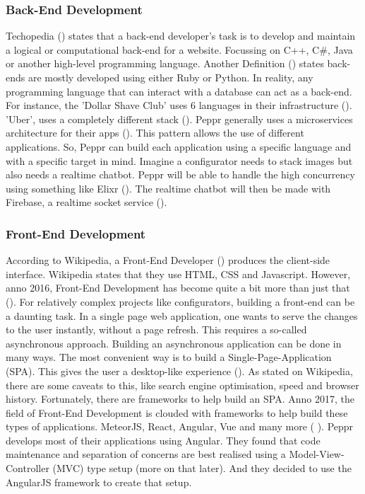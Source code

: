 \subsubsection{Back-End Development}
Techopedia (\cite{backendDevDefinition}) states that a back-end developer's task is to develop and maintain a logical or computational back-end for a website. Focussing on C++, C\#, Java or another high-level programming language. Another Definition (\cite{backendDevDefinition}) states back-ends are mostly developed using either Ruby or Python.
In reality, any programming language that can interact with a database can act as a back-end. For instance, the 'Dollar Shave Club' uses 6 languages in their infrastructure (\cite{dollarShaveClubBackEnd}). 'Uber', uses a completely different stack (\cite{uberBackEnd}).
Peppr generally uses a microservices architecture for their apps (\cite{microservices}). This pattern allows the use of different applications. So, Peppr can build each application using a specific language and with a specific target in mind. Imagine a configurator needs to stack images but also needs a realtime chatbot. Peppr will be able to handle the high concurrency using something like Elixr (\cite{elixr}). The realtime chatbot will then be made with Firebase, a realtime socket service (\cite{firebase}).

\subsubsection{Front-End Development}
According to Wikipedia, a Front-End Developer (\cite{frontEndDevDefinition}) produces the client-side interface. Wikipedia states that they use HTML, CSS and Javascript. However, anno 2016, Front-End Development has become quite a bit more than just that (\cite{javascriptAnno2016}). For relatively complex projects like configurators, building a front-end can be a daunting task. In a single page web application, one wants to serve the changes to the user instantly, without a page refresh. This requires a so-called asynchronous approach. 
Building an asynchronous application can be done in many ways. The most convenient way is to build a Single-Page-Application (SPA). This gives the user a desktop-like experience (\cite{singlePageApplications}). As stated on Wikipedia, there are some caveats to this, like search engine optimisation, speed and browser history. Fortunately, there are frameworks to help build an SPA. Anno 2017, the field of Front-End Development is clouded with frameworks to help build these types of applications. MeteorJS, React, Angular, Vue and many more (\cite{frontEndJavascriptFrameworks} ).
Peppr develops most of their applications using Angular. They found that code maintenance and separation of concerns are best realised using a Model-View-Controller (MVC) type setup (more on that later). And they decided to use the AngularJS framework to create that setup.


